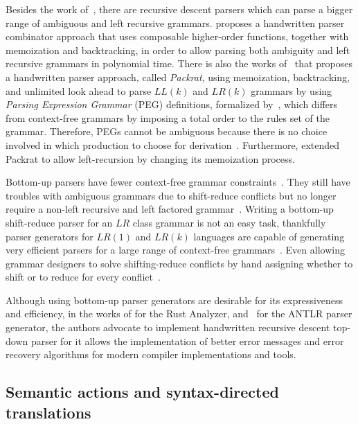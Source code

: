 \documentclass[
  oneside,
  english,
  coorientadorbanca,
  embeddedlogo,
  noabntexcite
]{ufsc-thesis-rn46-2019}
\begin{document}
Besides the work of~\textcite{pratt1973operatorprecedence}, there are recursive descent parsers which can parse a bigger range of ambiguous and left recursive grammars.
\textcite{10.1007/978-3-540-77442-6_12} proposes a handwritten parser combinator approach that uses composable higher-order functions, together with memoization and backtracking, in order to allow parsing both ambiguity and left recursive grammars in polynomial time.
There is also the works of~\textcite{10.1145/583852.581483} that proposes a handwritten parser approach, called \textit{Packrat}, using memoization, backtracking, and unlimited look ahead to parse $LL(k)$ and $LR(k)$ grammars by using \textit{Parsing Expression Grammar} (PEG) definitions, formalized by~\textcite{10.1145/982962.964011}, which differs from context-free grammars by imposing a total order to the rules set of the grammar.
Therefore, PEGs cannot be ambiguous because there is no choice involved in which production to choose for derivation~\cite{10.1145/982962.964011}.
Furthermore, \textcite{10.1145/1328408.1328424} extended Packrat to allow left-recursion by changing its memoization process.

Bottom-up parsers have fewer context-free grammar constraints~\cite{Aho:2006:CPT:1177220}.
They still have troubles with ambiguous grammars due to shift-reduce conflicts but no longer require a non-left recursive and left factored grammar~\cite{Aho:2006:CPT:1177220}.
Writing a bottom-up shift-reduce parser for an $LR$ class grammar is not an easy task, thankfully
parser generators for $LR(1)$ and $LR(k)$ languages are capable of generating very efficient parsers for a large range of context-free grammars~\cite{Aho:2006:CPT:1177220}.
Even allowing grammar designers to solve shifting-reduce conflicts by hand assigning whether to shift or to reduce for every conflict~\cite{Aho:2006:CPT:1177220}.

Although using bottom-up parser generators are desirable for its expressiveness and efficiency, in the works of \textcite{matklad2020challenginglrparsing, matklad2020prattparsing} for the Rust Analyzer, and~\textcite{Parr13} for the ANTLR parser generator, the authors advocate to implement handwritten recursive descent top-down parser for it allows the implementation of better error messages and error recovery algorithms for modern compiler implementations and tools.

\subsection{Semantic actions and syntax-directed translations}
\end{document}
